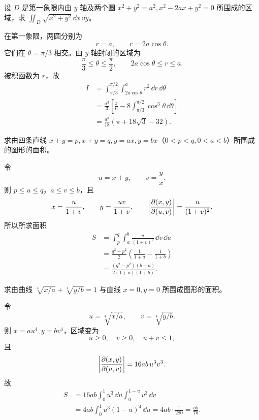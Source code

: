 \begin{xexercise}[8]
设 $D$ 是第一象限内由 $y$ 轴及两个圆 $x^2+y^2=a^2,x^2-2ax+y^2=0$ 所围成的区域，求 $\displaystyle\iint_D\sqrt{x^2+y^2}\,\dd x\,\dd y$。
\end{xexercise}
\begin{xsolution}
在第一象限，两圆分别为
\[
  r=a,
  \qquad r=2a\cos\theta.
\]
它们在 $\theta=\pi/3$ 相交。由 $y$ 轴封闭的区域为
\[
  \frac\pi3\le\theta\le\frac\pi2,
  \qquad2a\cos\theta\le r\le a.
\]
被积函数为 $r$，故
\begin{align*}
 I&=\int_{\pi/3}^{\pi/2}\int_{2a\cos\theta}^{a}r^2\,\dd r\,\dd\theta\\
 &=\frac{a^3}{3}\left[\frac\pi6-8\int_{\pi/3}^{\pi/2}\cos^3\theta\,\dd\theta\right]\\
 &=\boxed{\frac{a^3}{18}\left(\pi+18\sqrt3-32\right)}.
\end{align*}
\end{xsolution}


\begin{xexercise}[9]
求由四条直线 $x+y=p,x+y=q,y=ax,y=bx$（$0<p<q,0<a<b$）所围成的图形的面积。
\end{xexercise}
\begin{xsolution}
令
\[
  u=x+y,\qquad v=\frac yx.
\]
则 $p\le u\le q$，$a\le v\le b$，且
\[
  x=\frac{u}{1+v},\qquad y=\frac{uv}{1+v},
  \qquad
  \abs*{\frac{\partial(x,y)}{\partial(u,v)}}=\frac{u}{(1+v)^2}.
\]
所以所求面积
\begin{align*}
 S&=\int_p^q\int_a^b\frac{u}{(1+v)^2}\,\dd v\,\dd u\\
 &=\frac{q^2-p^2}{2}\left(\frac1{1+a}-\frac1{1+b}\right)\\
 &=\boxed{\frac{(q^2-p^2)(b-a)}{2(1+a)(1+b)}}.
\end{align*}
\end{xsolution}


\begin{xexercise}[10]
求由曲线 $\sqrt[4]{x/a}+\sqrt[4]{y/b}=1$ 与直线 $x=0,y=0$ 所围成图形的面积。
\end{xexercise}
\begin{xsolution}
令
\[
  u=\sqrt[4]{x/a},\qquad v=\sqrt[4]{y/b}.
\]
则 $x=au^4,y=bv^4$，区域变为
\[
  u\ge0,\quad v\ge0,\quad u+v\le1,
\]
且
\[
  \abs*{\frac{\partial(x,y)}{\partial(u,v)}}=16ab\,u^3v^3.
\]
故
\begin{align*}
 S&=16ab\int_0^1u^3\,\dd u\int_0^{1-u}v^3\,\dd v\\
 &=4ab\int_0^1u^3(1-u)^4\,\dd u
 =4ab\cdot\frac1{280}=\boxed{\frac{ab}{70}}.
\end{align*}
\end{xsolution}


